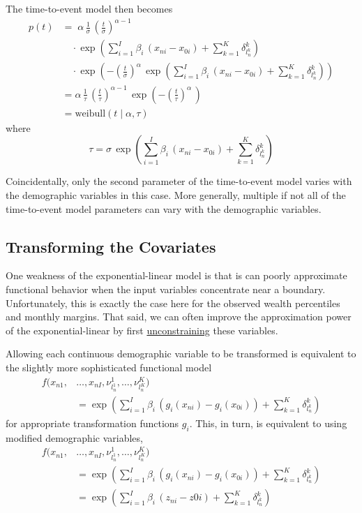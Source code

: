\documentclass[
  letterpaper,
  DIV=11,
  numbers=noendperiod]{scrartcl}
\begin{document}
The time-to-event model then becomes \begin{align*}
p(t)
&=\;
\alpha \, \frac{1}{\sigma} \,
\left( \frac{t}{\sigma} \right)^{\alpha - 1} \,
\\
&\quad \cdot
\exp \left(
    \sum_{i = 1}^{I} \beta_{i} \, (x_{ni} - x_{0i})
  + \sum_{k = 1}^{K} \delta^{k}_{l^{k}_{n}}
\right) \,
\\
&\quad \cdot
\exp \left(
  - \left( \frac{t}{\sigma} \right)^{\alpha} \,
    \exp \left(
        \sum_{i = 1}^{I} \beta_{i} \, (x_{ni} - x_{0i})
      + \sum_{k = 1}^{K} \delta^{k}_{l^{k}_{n}}
    \right)
\right)
\\
&=
\alpha \, \frac{1}{\tau} \,
\left( \frac{t}{\tau} \right)^{\alpha - 1} \,
\exp \left(
  - \left( \frac{t}{\tau} \right)^{\alpha} \,
\right)
\\
&=
\mathrm{weibull}(t \mid \alpha, \tau)
\end{align*} where \[
\tau
=
\sigma \, \exp \left(
    \sum_{i = 1}^{I} \beta_{i} \, (x_{ni} - x_{0i})
  + \sum_{k = 1}^{K} \delta^{k}_{l^{k}_{n}}
\right)
\]

Coincidentally, only the second parameter of the time-to-event model
varies with the demographic variables in this case. More generally,
multiple if not all of the time-to-event model parameters can vary with
the demographic variables.

\subsection{Transforming the
Covariates}\label{transforming-the-covariates}

One weakness of the exponential-linear model is that is can poorly
approximate functional behavior when the input variables concentrate
near a boundary. Unfortunately, this is exactly the case here for the
observed wealth percentiles and monthly margins. That said, we can often
improve the approximation power of the exponential-linear by first
\href{http://www.symplectomorphic.com/assets/case_studies/taylor_models.html\#14_Covariate_Boundaries}{unconstraining}
these variables.

Allowing each continuous demographic variable to be transformed is
equivalent to the slightly more sophisticated functional model
\begin{align*}
f(
  x_{n1}, &\ldots, x_{nI},
  \nu^{1}_{l^{1}_{n}}, \ldots, \nu^{K}_{l^{K}_{n}}
)
\\
&=
\exp \left(
    \sum_{i = 1}^{I} \beta_{i} \, ( g_{i}(x_{ni}) - g_{i}(x_{0i}) )
  + \sum_{k = 1}^{K} \delta^{k}_{l^{k}_{n}}
\right)
\end{align*} for appropriate transformation functions \(g_{i}\). This,
in turn, is equivalent to using modified demographic variables,
\begin{align*}
f(
  x_{n1}, &\ldots, x_{nI},
  \nu^{1}_{l^{1}_{n}}, \ldots, \nu^{K}_{l^{K}_{n}}
)
\\
&=
\exp \left(
    \sum_{i = 1}^{I} \beta_{i} \, ( g_{i}(x_{ni}) - g_{i}(x_{0i}) )
  + \sum_{k = 1}^{K} \delta^{k}_{l^{k}_{n}}
\right)
\\
&=
\exp \left(
    \sum_{i = 1}^{I} \beta_{i} \, ( z_{ni} - z{0i} )
  + \sum_{k = 1}^{K} \delta^{k}_{l^{k}_{n}}
\right)
\end{align*}
\end{document}
